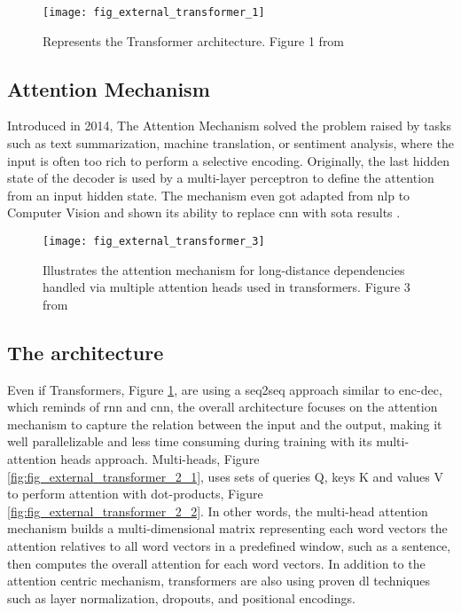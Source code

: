\begin{figure}
    \centering
    \texttt{[image: fig\_external\_transformer\_1]}
    \caption{Represents the Transformer architecture. Figure 1 from \autocite{paper:journals/corr/VaswaniSPUJGKP17}}
    \label{fig:fig_external_transformer_1}
\end{figure}

\subsection{Attention Mechanism}
\label{nlp:attention}
Introduced in 2014, The Attention Mechanism \autocite{paper:bahdanau2014neural} solved the problem raised by tasks such as text summarization, machine translation, or sentiment analysis, where the input is often too rich to perform a selective encoding. Originally, the last hidden state of the decoder is used by a multi-layer perceptron to define the attention from an input hidden state. The mechanism even got adapted from \gls{nlp} to Computer Vision and shown its ability to replace \gls{cnn} with \gls{sota} results \autocite{paper:journals/corr/abs-1906-05909}.

\begin{figure}
    \centering
    \texttt{[image: fig\_external\_transformer\_3]}
    \caption{Illustrates the attention mechanism for long-distance dependencies handled via multiple attention heads used in transformers. Figure 3 from \autocite{paper:journals/corr/VaswaniSPUJGKP17}}
    \label{fig:fig_external_transformer_3}
\end{figure}

\subsection{The architecture}
Even if Transformers, Figure \ref{fig:fig_external_transformer_1}, are using a \gls{seq2seq} approach similar to \gls{enc-dec}, which reminds of \gls{rnn} and \gls{cnn}, the overall architecture focuses on the attention mechanism to capture the relation between the input and the output, making it well parallelizable and less time consuming during training with its multi-attention heads approach. Multi-heads, Figure \ref{fig:fig_external_transformer_2_1}, uses sets of queries Q, keys K and values V to perform attention with dot-products, Figure \ref{fig:fig_external_transformer_2_2}. In other words, the multi-head attention mechanism builds a multi-dimensional matrix representing each word vectors the attention relatives to all word vectors in a predefined window, such as a sentence, then computes the overall attention for each word vectors. In addition to the attention centric mechanism, transformers are also using proven \gls{dl} techniques such as layer normalization, dropouts, and positional encodings.


